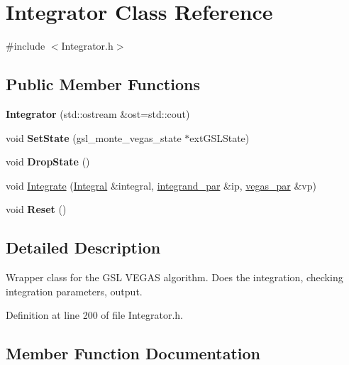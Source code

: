 \hypertarget{classIntegrator}{}\section{Integrator Class Reference}
\label{classIntegrator}


{\ttfamily \#include $<$Integrator.\+h$>$}

\subsection*{Public Member Functions}
\begin{DoxyCompactItemize}
\item 
\hypertarget{classIntegrator_a410d73f69871a01a49401a6705325a46}{}{\bfseries Integrator} (std\+::ostream \&ost=std\+::cout)\label{classIntegrator_a410d73f69871a01a49401a6705325a46}

\item 
\hypertarget{classIntegrator_aa4e70784278ed8a0e07bb59a153a4098}{}void {\bfseries Set\+State} (gsl\+\_\+monte\+\_\+vegas\+\_\+state $\ast$ext\+G\+S\+L\+State)\label{classIntegrator_aa4e70784278ed8a0e07bb59a153a4098}

\item 
\hypertarget{classIntegrator_a7abd0680a883e614c1e6344c8fda5360}{}void {\bfseries Drop\+State} ()\label{classIntegrator_a7abd0680a883e614c1e6344c8fda5360}

\item 
void \hyperlink{classIntegrator_a999142aeac7e98ab084eaad2c257a233}{Integrate} (\hyperlink{classIntegral}{Integral} \&integral, \hyperlink{classintegrand__par}{integrand\+\_\+par} \&ip, \hyperlink{classvegas__par}{vegas\+\_\+par} \&vp)
\item 
\hypertarget{classIntegrator_ac9ea33447f83278d1bd1dd37ac70e30e}{}void {\bfseries Reset} ()\label{classIntegrator_ac9ea33447f83278d1bd1dd37ac70e30e}

\end{DoxyCompactItemize}


\subsection{Detailed Description}
Wrapper class for the G\+S\+L V\+E\+G\+A\+S algorithm. Does the integration, checking integration parameters, output. 

Definition at line 200 of file Integrator.\+h.



\subsection{Member Function Documentation}
\hypertarget{classIntegrator_a999142aeac7e98ab084eaad2c257a233}{}

